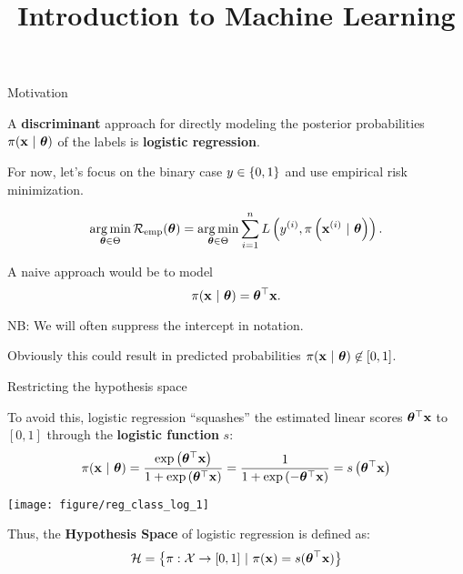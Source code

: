 \documentclass[11pt,compress,t,notes=noshow, xcolor=table]{beamer}
\title{Introduction to Machine Learning}
\begin{document}

\framebreak


\begin{vbframe}{Motivation}

A \textbf{discriminant} approach for directly modeling the posterior probabilities $\pi(\mathbf{x}~|~ \bm{\theta})$ of the labels is \textbf{logistic regression}. 

For now, let's focus on the binary case $y \in \{0, 1\}$ and use empirical risk minimization.
  
$$ \operatorname*{arg\,min}_{\bm{\theta} \in \Theta} \mathcal{R}_{\text{emp}}(\bm{\theta}) = \operatorname*{arg\,min}_{\bm{\theta} \in \Theta} \sum\limits_{i=1}^n L\left(y^{(i)}, \pi\left(\mathbf{x}^{(i)} ~|~ \bm{\theta}\right)\right).$$

\lz
A naive approach would be to model
\[
\pi(\mathbf{x}~|~ \bm{\theta}) = \bm{\theta}^\top \mathbf{x} .
\]

NB: We will often suppress the intercept in notation.

\lz

Obviously this could result in predicted probabilities $\pi(\mathbf{x}~|~ \bm{\theta}) \not\in [0,1]$.

\end{vbframe}

\begin{vbframe}{Restricting the hypothesis space}

To avoid this, logistic regression \enquote{squashes} the estimated linear scores $\bm{\theta}^\top \mathbf{x}$ to $[0,1]$ through the \textbf{logistic function} $s$:
\[
\pi(\mathbf{x}~|~ \bm{\theta}) = \frac{\exp\left( \bm{\theta}^\top \mathbf{x} \right)}{1+\exp\left(\bm{\theta}^\top \mathbf{x} \right)} = \frac{1}{1+\exp\left( -\bm{\theta}^\top \mathbf{x} \right)} = s\left( \bm{\theta}^\top \mathbf{x} \right)
\]

\begin{knitrout}\scriptsize
{}\color{fgcolor}

{\centering \texttt{[image: figure/reg\_class\_log\_1]} 

}

\end{knitrout}

Thus, the \textbf{Hypothesis Space} of logistic regression is defined as:
\begin{eqnarray*}
  \mathcal{H} = \left\{\pi: \mathcal{X} \to [0,1] ~|~\pi(\mathbf{x}) = s(\bm{\theta}^\top \mathbf{x}) \right\}
\end{eqnarray*}

\end{vbframe}
\end{document}

